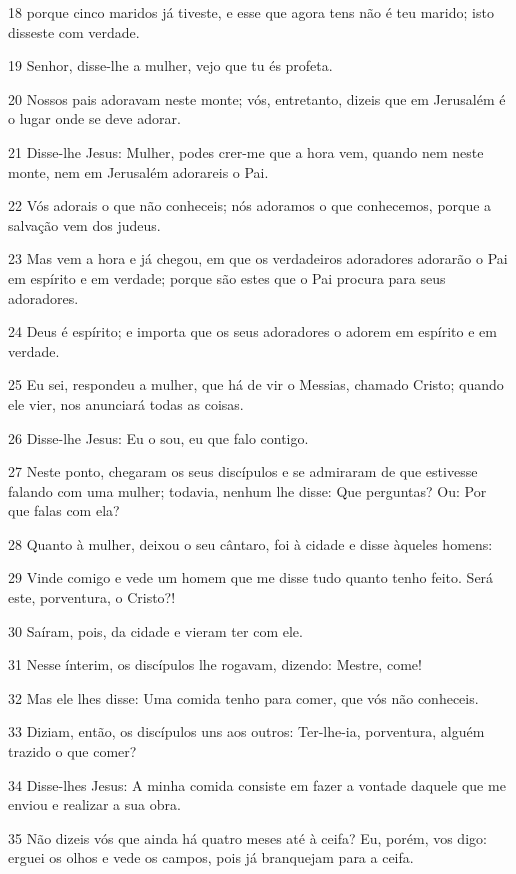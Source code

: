 \par 18 porque cinco maridos já tiveste, e esse que agora tens não é teu marido; isto disseste com verdade.
\par 19 Senhor, disse-lhe a mulher, vejo que tu és profeta.
\par 20 Nossos pais adoravam neste monte; vós, entretanto, dizeis que em Jerusalém é o lugar onde se deve adorar.
\par 21 Disse-lhe Jesus: Mulher, podes crer-me que a hora vem, quando nem neste monte, nem em Jerusalém adorareis o Pai.
\par 22 Vós adorais o que não conheceis; nós adoramos o que conhecemos, porque a salvação vem dos judeus.
\par 23 Mas vem a hora e já chegou, em que os verdadeiros adoradores adorarão o Pai em espírito e em verdade; porque são estes que o Pai procura para seus adoradores.
\par 24 Deus é espírito; e importa que os seus adoradores o adorem em espírito e em verdade.
\par 25 Eu sei, respondeu a mulher, que há de vir o Messias, chamado Cristo; quando ele vier, nos anunciará todas as coisas.
\par 26 Disse-lhe Jesus: Eu o sou, eu que falo contigo.
\par 27 Neste ponto, chegaram os seus discípulos e se admiraram de que estivesse falando com uma mulher; todavia, nenhum lhe disse: Que perguntas? Ou: Por que falas com ela?
\par 28 Quanto à mulher, deixou o seu cântaro, foi à cidade e disse àqueles homens:
\par 29 Vinde comigo e vede um homem que me disse tudo quanto tenho feito. Será este, porventura, o Cristo?!
\par 30 Saíram, pois, da cidade e vieram ter com ele.
\par 31 Nesse ínterim, os discípulos lhe rogavam, dizendo: Mestre, come!
\par 32 Mas ele lhes disse: Uma comida tenho para comer, que vós não conheceis.
\par 33 Diziam, então, os discípulos uns aos outros: Ter-lhe-ia, porventura, alguém trazido o que comer?
\par 34 Disse-lhes Jesus: A minha comida consiste em fazer a vontade daquele que me enviou e realizar a sua obra.
\par 35 Não dizeis vós que ainda há quatro meses até à ceifa? Eu, porém, vos digo: erguei os olhos e vede os campos, pois já branquejam para a ceifa.
